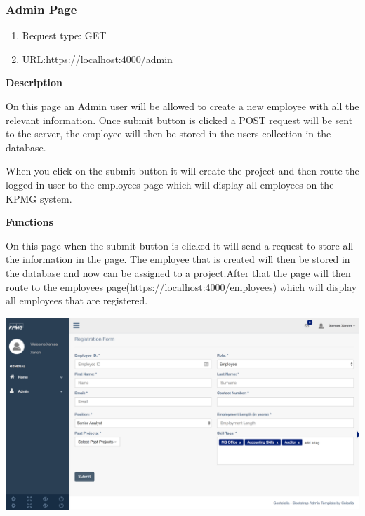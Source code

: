 \documentclass[a4paper,12pt]{article}
\begin{document}
     	\subsubsection{Admin Page}
     		\begin{enumerate}
     		\item Request type: GET
     		\item URL:\url{https://localhost:4000/admin} 
     	\end{enumerate}
     	 \textbf{Description}
     	\begin{flushleft}
     		On this page an Admin user will be allowed to create a new employee with all the relevant information. Once submit button is clicked a POST request will be sent to the server, the employee will then be stored in the users collection in the database. 
     		
     		When you click on the submit button it will create the project and then route the logged in user to the employees page which will display all employees on the KPMG system.
     	\end{flushleft}
 		\textbf{Functions}
 		\begin{flushleft}
 			On this page when the submit button is clicked it will send a request to store all the information in the page. The employee that is created will then be stored in the database and now can be assigned to a project.After that the page will then route to the employees page(\url{https://localhost:4000/employees}) which will display all employees that are registered.
 		\end{flushleft}
 		\linebreak
 	    \includegraphics[width=0.99\linewidth]{Images/admin_register_emp.png}
\end{document}
